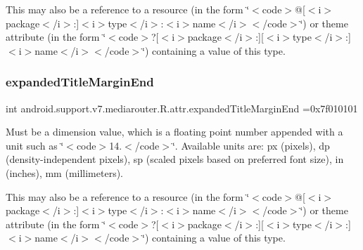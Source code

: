 This may also be a reference to a resource (in the form \char`\"{}$<$code$>$@\mbox{[}$<$i$>$package$<$/i$>$\+:\mbox{]}$<$i$>$type$<$/i$>$\+:$<$i$>$name$<$/i$>$$<$/code$>$\char`\"{}) or theme attribute (in the form \char`\"{}$<$code$>$?\mbox{[}$<$i$>$package$<$/i$>$\+:\mbox{]}\mbox{[}$<$i$>$type$<$/i$>$\+:\mbox{]}$<$i$>$name$<$/i$>$$<$/code$>$\char`\"{}) containing a value of this type. \mbox{\label{classandroid_1_1support_1_1v7_1_1mediarouter_1_1R_1_1attr_ae7382f06326cf8a453209c07b9d50216}} 
\subsubsection{\texorpdfstring{expanded\+Title\+Margin\+End}{expandedTitleMarginEnd}}
{\footnotesize\ttfamily int android.\+support.\+v7.\+mediarouter.\+R.\+attr.\+expanded\+Title\+Margin\+End =0x7f010101\hspace{0.3cm}{\ttfamily [static]}}

Must be a dimension value, which is a floating point number appended with a unit such as \char`\"{}$<$code$>$14.\+5sp$<$/code$>$\char`\"{}. Available units are\+: px (pixels), dp (density-\/independent pixels), sp (scaled pixels based on preferred font size), in (inches), mm (millimeters). 

This may also be a reference to a resource (in the form \char`\"{}$<$code$>$@\mbox{[}$<$i$>$package$<$/i$>$\+:\mbox{]}$<$i$>$type$<$/i$>$\+:$<$i$>$name$<$/i$>$$<$/code$>$\char`\"{}) or theme attribute (in the form \char`\"{}$<$code$>$?\mbox{[}$<$i$>$package$<$/i$>$\+:\mbox{]}\mbox{[}$<$i$>$type$<$/i$>$\+:\mbox{]}$<$i$>$name$<$/i$>$$<$/code$>$\char`\"{}) containing a value of this type. \mbox{\label{classandroid_1_1support_1_1v7_1_1mediarouter_1_1R_1_1attr_a96b4e59b005c6dd2be8bb1e64996185b}} 
